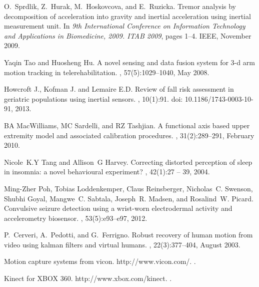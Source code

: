 \documentclass{IOS-Book-Article}
\begin{document}
\begin{thebibliography}{99}


O.~Sprdlik, Z.~Hurak, M.~Hoskovcova, and E.~Ruzicka.
\newblock Tremor analysis by decomposition of acceleration into gravity and
  inertial acceleration using inertial measurement unit.
\newblock In {\em 9th International Conference on Information Technology and
  Applications in Biomedicine, 2009. {ITAB} 2009}, pages 1--4. {IEEE}, November
  2009.
 
Yaqin Tao and Huosheng Hu.
\newblock A novel sensing and data fusion system for 3-d arm motion tracking in
  telerehabilitation.
,
  57(5):1029--1040, May 2008.

Howcroft J., Kofman J. and Lemaire E.D.
\newblock Review of fall risk assessment in geriatric populations using inertial sensors.
, 10(1):91. doi: 10.1186/1743-0003-10-91, 2013.

{BA} {MacWilliams}, {MC} Sardelli, and {RZ} Tashjian.
\newblock A functional axis based upper extremity model and associated
  calibration procedures.
, 31(2):289--291, February 2010.

Nicole~K.Y Tang and Allison~G Harvey.
\newblock Correcting distorted perception of sleep in insomnia: a novel
  behavioural experiment?
, 42(1):27 -- 39, 2004.

Ming-Zher Poh, Tobias Loddenkemper, Claus Reinsberger, Nicholas~C. Swenson,
  Shubhi Goyal, Mangwe~C. Sabtala, Joseph~R. Madsen, and Rosalind~W. Picard.
\newblock Convulsive seizure detection using a wrist-worn electrodermal
  activity and accelerometry biosensor.
, 53(5):e93--e97, 2012.

P.~Cerveri, A.~Pedotti, and G.~Ferrigno.
\newblock Robust recovery of human motion from video using kalman filters and
  virtual humans.
, 22(3):377--404, August 2003.

Motion capture systems from vicon.
\newblock http://www.vicon.com/.
.

Kinect for {XBOX} 360.
\newblock http://www.xbox.com/kinect.
.


\end{thebibliography}
\end{document}
